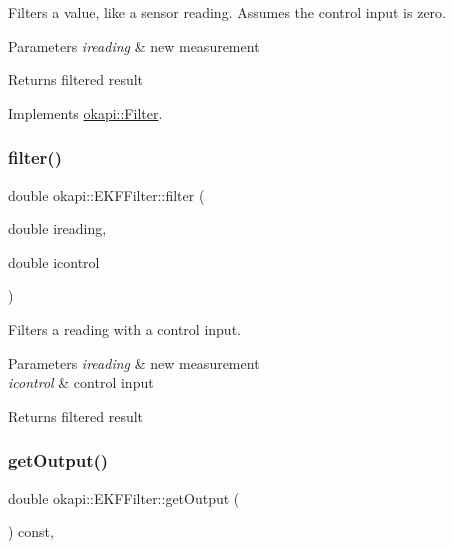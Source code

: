 Filters a value, like a sensor reading. Assumes the control input is zero.


\begin{DoxyParams}{Parameters}
{\em ireading} & new measurement \\
\hline
\end{DoxyParams}
\begin{DoxyReturn}{Returns}
filtered result 
\end{DoxyReturn}


Implements \mbox{\hyperlink{classokapi_1_1Filter_a7c2ea0b64b37b688900189856d58da15}{okapi\+::\+Filter}}.

\mbox{\label{classokapi_1_1EKFFilter_a3999b84a0cf2cd2a4b5de20cfa7ed1f8}} 
\subsubsection{\texorpdfstring{filter()}{filter()}\hspace{0.1cm}{\footnotesize\ttfamily [2/2]}}
{\footnotesize\ttfamily double okapi\+::\+E\+K\+F\+Filter\+::filter (\begin{DoxyParamCaption}\item[{double}]{ireading,  }\item[{double}]{icontrol }\end{DoxyParamCaption})\hspace{0.3cm}{\ttfamily [virtual]}}

Filters a reading with a control input.


\begin{DoxyParams}{Parameters}
{\em ireading} & new measurement \\
\hline
{\em icontrol} & control input \\
\hline
\end{DoxyParams}
\begin{DoxyReturn}{Returns}
filtered result 
\end{DoxyReturn}
\mbox{\label{classokapi_1_1EKFFilter_aaf3048eb6d68d248de7c59f84b0d1201}} 
\subsubsection{\texorpdfstring{getOutput()}{getOutput()}}
{\footnotesize\ttfamily double okapi\+::\+E\+K\+F\+Filter\+::get\+Output (\begin{DoxyParamCaption}{ }\end{DoxyParamCaption}) const\hspace{0.3cm}{\ttfamily [override]}, {\ttfamily [virtual]}}

